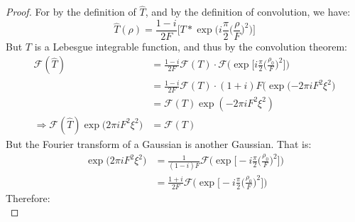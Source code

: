         \begin{proof}
            For by the definition of $\hat{T}$, and by the
            definition of convolution, we have:
            \begin{equation}
                \hat{T}(\rho)
                =\frac{1-i}{2F}\Big[
                    T*\exp\Big(i\frac{\pi}{2}\big(\frac{\rho}{F}\big)^{2}
                \Big)\Big]
            \end{equation}
            But $T$ is a Lebesgue integrable function, and thus by
            the convolution theorem:
            \begin{subequations}
                \begin{align}
                    \mathcal{F}(\hat{T})
                    &=\frac{1-i}{2F}\mathcal{F}(T)\cdot
                        \mathcal{F}\Big(
                            \exp\Big[i\frac{\pi}{2}
                            \big(\frac{\rho_{0}}{F}\big)^{2}
                        \Big]\Big)\\
                    &=\frac{1-i}{2F}\mathcal{F}(T)\cdot
                        (1+i)F\big(
                            \exp(\minus{2}\pi{i}F^{2}\xi^{2}
                        \big)\\
                    &=\mathcal{F}(T)\exp(\minus{2}\pi{i}F^{2}\xi^{2})\\
                        \Rightarrow
                        \mathcal{F}(\hat{T})
                        \exp\big(2\pi{i}F^{2}\xi^{2}\big)
                    &=\mathcal{F}(T)
                \end{align}
            \end{subequations}
            But the Fourier transform of a Gaussian is
            another Gaussian. That is:
            \begin{subequations}
                \begin{align}
                    \exp\big(2\pi{i}F^{2}\xi^{2}\big)
                    &=\frac{1}{(1-i)F}\mathcal{F}\Big(
                        \exp\Big[\minus{i}\frac{\pi}{2}
                        \big(\frac{\rho_{0}}{F}\big)^{2}\Big]\Big)\\
                    &=\frac{1+i}{2F}\mathcal{F}\Big(
                        \exp\Big[\minus{i}\frac{\pi}{2}
                            \big(\frac{\rho_0}{F}\big)^{2}
                        \Big]\Big)
                \end{align}
            \end{subequations}
            Therefore:
            \begin{subequations}

\end{subequations}
\end{proof}
